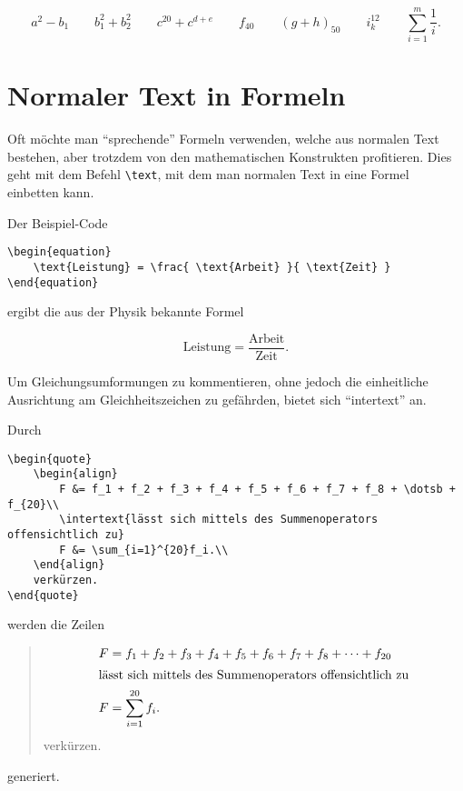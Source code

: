 \begin{equation}
	a^2 - b_1
	\qquad
	b_1^2 + b_2^2 
	\qquad
	c^{20} + c^{d + e} 
	\qquad
	f_{40}
	\qquad
	(g + h)_{50}
	\qquad
	i^12_k
	\qquad
	\sum^m_{i=1} \frac 1i.
\end{equation}

\section{Normaler Text in Formeln}

Oft möchte man \enquote{sprechende} Formeln verwenden, welche aus normalen Text bestehen, aber trotzdem von den mathematischen Konstrukten profitieren. Dies geht mit dem Befehl \texttt{\textbackslash text}, mit dem man normalen Text in eine Formel einbetten kann.

Der Beispiel-Code

\begin{lstlisting}
\begin{equation}
	\text{Leistung} = \frac{ \text{Arbeit} }{ \text{Zeit} }
\end{equation}
\end{lstlisting} 

ergibt die aus der Physik bekannte Formel

\begin{equation}
	\text{Leistung} = \frac{ \text{Arbeit} }{ \text{Zeit} }.
\end{equation}

Um Gleichungsumformungen zu kommentieren, ohne jedoch die einheitliche Ausrichtung am Gleichheitszeichen zu gefährden, bietet sich \enquote{intertext} an.

Durch

\begin{lstlisting}
\begin{quote}
	\begin{align}
		F &= f_1 + f_2 + f_3 + f_4 + f_5 + f_6 + f_7 + f_8 + \dotsb + f_{20}\\
		\intertext{lässt sich mittels des Summenoperators offensichtlich zu}
		F &= \sum_{i=1}^{20}f_i.\\
	\end{align}
	verkürzen.
\end{quote}
\end{lstlisting}

werden die Zeilen
\begin{quote}
	\begin{align}
		F &= f_1 + f_2 + f_3 + f_4 + f_5 + f_6 + f_7 + f_8 + \dotsb + f_{20}\\
		\intertext{lässt sich mittels des Summenoperators offensichtlich zu}
		F &= \sum_{i=1}^{20}f_i.
	\end{align}
	verkürzen.
\end{quote}
generiert.

